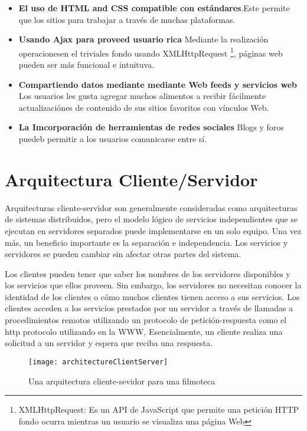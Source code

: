 \begin{itemize}
	\item \textbf{El uso de HTML and CSS compatible con est\'{a}ndares}.Este permite que los sitios para trabajar a 
	trav\'{e}s de muchas plataformas.
	\item \textbf{Usando Ajax para proveed usuario rica} Mediante la realizaci\'{o}n operacionesen el triviales
	fondo usando XMLHttpRequest \footnote{XMLHttpRequest: Es un API de JavaScript que permite una petici\'{o}n HTTP fondo ocurra
	mientras un usuario se visualiza una p\'{a}gina Web}, p\'{a}ginas web pueden ser m\'{a}s funcional e intuituva.
	\item \textbf{Compartiendo datos mediante mediante Web feeds y servicios web} Los usuarios les gusta agregar 
	muchos alimentos a recibir f\'{a}cilmente actualizaci\'{o}nes de contenido de sus sitios favoritos con 
	v\'{i}nculos Web.
	\item \textbf{La Imcorporaci\'{o}n de herramientas de redes sociales} Blogs y foros puedeb permitir a los usuarios
	comunicarse entre s\'{i}.
\end{itemize}

\section{Arquitectura Cliente/Servidor}

Arquitecturas cliente-servidor son generalmente consideradas como arquitecturas de sistemas distribuidos, pero el modelo 
l\'{o}gico de servicios independientes que se ejecutan en servidores separados puede implementarse en un solo equipo. Una
vez m\'{a}s, un beneficio importante es la separaci\'{o}n e independencia. Los servicios y servidores se pueden cambiar
sin afectar otras partes del sistema.

Los clientes pueden tener que saber los nombres de los servidores disponibles y los servicios que ellos proveen. Sin 
embargo, los servidores no necesitan conocer la identidad de los clientes o c\'{o}mo muchos clientes tienen acceso a sus
servicios. Los clientes acceden a los servicios prestados por un servidor a trav\'{e}s de llamadas a procedimientos remotos
utilizando un protocolo de petici\'{o}n-respuesta como el http protocolo utilizando en la WWW, Esencialmente, un cliente
realiza una solicitud a un servidor y espera que reciba una respuesta.\cite{sommerville2011software}

\begin{figure}[!htb]
\centering
\texttt{[image: architectureClientServer]}
\caption{Una arquitectura cliente-sevidor para una filmoteca}
\end{figure}

